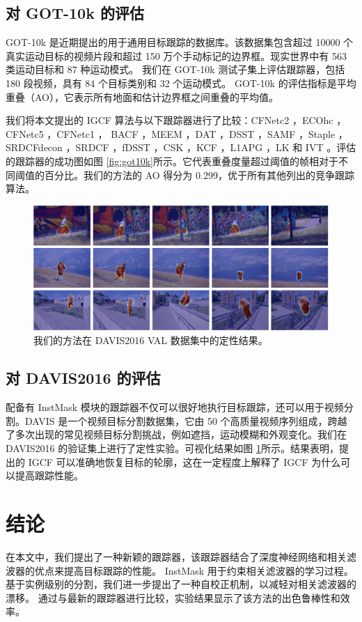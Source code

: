 \subsection{对 GOT-10k 的评估}
GOT-10k \cite{GOT-10k} 是近期提出的用于通用目标跟踪的数据库。该数据集包含超过 10000 个真实运动目标的视频片段和超过 150 万个手动标记的边界框。现实世界中有 563 类运动目标和 87 种运动模式。
我们在 GOT-10k 测试子集上评估跟踪器，包括 180 段视频，具有 84 个目标类别和 32 个运动模式。
GOT-10k 的评估指标是平均重叠（AO），它表示所有地面和估计边界框之间重叠的平均值。

我们将本文提出的 IGCF 算法与以下跟踪器进行了比较：CFNetc2 \cite{Valmadre2017EndtoEndRL}，ECOhc \cite{Danelljan2017ECOEC}，CFNetc5 \cite{Valmadre2017EndtoEndRL}，CFNetc1 \cite{Valmadre2017EndtoEndRL}， BACF \cite{Galoogahi2017LearningBC}，MEEM \cite{Zhang2014MEEMRT}，DAT \cite{Possegger2015InDO}，DSST \cite{Danelljan2014AccurateSE}，SAMF \cite{Li2014ASA}，Staple \cite{Bertinetto2016StapleC}，SRDCFdecon \cite{Danelljan2016AdaptiveDO}，SRDCF \cite{Danelljan2015LearningSR}，fDSST \cite{Danelljan2017DiscriminativeSS}，CSK \cite{Henriques2012ExploitingTC}，KCF \cite{henriques2014high-speed}，L1APG \cite{Bao2012RealTR}，LK \cite{Shi1994GoodFT} 和 IVT \cite{Ross2007IncrementalLF}。评估的跟踪器的成功图如图 \ref{fig:got10k}所示。它代表重叠度量超过阈值的帧相对于不同阈值的百分比。我们的方法的 AO 得分为 0.299，优于所有其他列出的竞争跟踪算法。

\begin{figure}[t]
\centering
\includegraphics[width=\textwidth]{Img/IGCF/davis.pdf}
\caption{我们的方法在 DAVIS2016 VAL 数据集中的定性结果。}
\label{fig:davis}
\end{figure}

\subsection{对 DAVIS2016 的评估}
配备有 InstMask 模块的跟踪器不仅可以很好地执行目标跟踪，还可以用于视频分割。DAVIS \cite{Perazzi2016} 是一个视频目标分割数据集，它由 50 个高质量视频序列组成，跨越了多次出现的常见视频目标分割挑战，例如遮挡，运动模糊和外观变化。我们在 DAVIS2016 的验证集上进行了定性实验。可视化结果如图 \ref{fig:davis}所示。结果表明，提出的 IGCF 可以准确地恢复目标的轮廓，这在一定程度上解释了 IGCF 为什么可以提高跟踪性能。

\section{结论}
在本文中，我们提出了一种新颖的跟踪器，该跟踪器结合了深度神经网络和相关滤波器的优点来提高目标跟踪的性能。
InstMask 用于约束相关滤波器的学习过程。基于实例级别的分割，我们进一步提出了一种自校正机制，以减轻对相关滤波器的漂移。
通过与最新的跟踪器进行比较，实验结果显示了该方法的出色鲁棒性和效率。